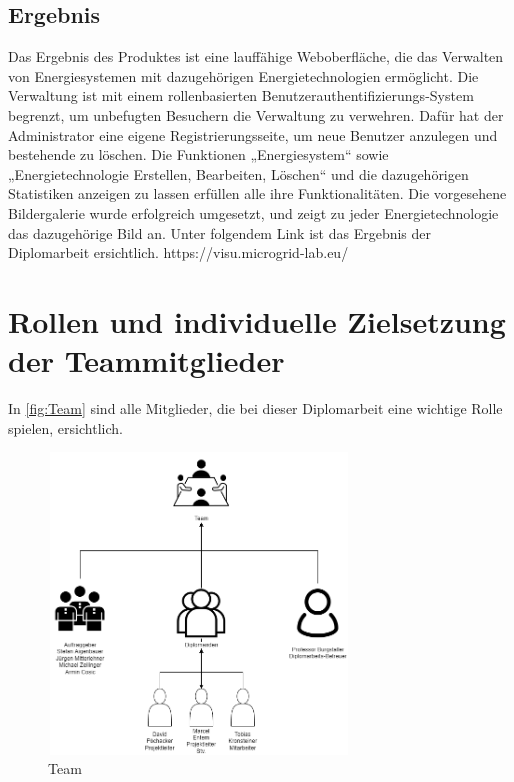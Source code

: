 \subsection{Ergebnis}
Das Ergebnis des Produktes ist eine lauffähige Weboberfläche, die das Verwalten von Energiesystemen mit dazugehörigen Energietechnologien ermöglicht. Die Verwaltung ist mit einem rollenbasierten Benutzerauthentifizierungs-System begrenzt, um unbefugten Besuchern die Verwaltung zu verwehren. Dafür hat der Administrator eine eigene Registrierungsseite, um neue Benutzer anzulegen und bestehende zu löschen. Die Funktionen „Energiesystem“ sowie „Energietechnologie Erstellen, Bearbeiten, Löschen“ und die dazugehörigen Statistiken anzeigen zu lassen erfüllen alle ihre Funktionalitäten. Die vorgesehene Bildergalerie wurde erfolgreich umgesetzt, und zeigt zu jeder Energietechnologie das dazugehörige Bild an.
Unter folgendem Link ist das Ergebnis der Diplomarbeit ersichtlich.
https://visu.microgrid-lab.eu/


\newpage
\section{Rollen und individuelle Zielsetzung der Teammitglieder}
In \autoref{fig:Team} sind alle Mitglieder, die bei dieser Diplomarbeit eine wichtige Rolle spielen, ersichtlich.

\begin{figure}[h]
	\centering
	\includegraphics[height=8cm,width=8cm]{images/Team}
	\caption{Team}
	\label{fig:Team}
\end{figure}



